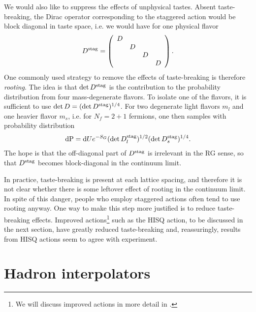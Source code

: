 We would also like to suppress the effects of unphysical tastes. Absent
taste-breaking, the Dirac operator corresponding to the staggered action
would be block diagonal in taste space, i.e. we would have for 
one physical flavor
\begin{equation}
D^{\rm stag}=\left(\begin{array}{cccc}
            D &   &  &  \\
              & D &  &  \\
              &   & D&  \\
              &   &  & D\\
            \end{array}\right).
\end{equation}
One commonly used strategy to remove the effects of taste-breaking is
therefore {\it rooting}\cite{marinari_monte_1981}. 
The idea is that $\det D^{\rm stag}$ is
the contribution to the probability distribution from four mass-degenerate
flavors. To isolate one of the flavors, it is sufficient to use
$\det D=(\det D^{\rm stag})^{1/4}$. For two degenerate light flavors
$m_l$ and one heavier flavor $m_s$, i.e. for $N_f=2+1$ fermions, 
one then samples with probability distribution
\begin{equation}\label{eq:HISQdist}
  \dd{\rm P}
    =\dd Ue^{-S_G}(\det D_l^{\rm stag})^{1/2}(\det D_s^{\rm stag})^{1/4}.
\end{equation}
The hope is that the off-diagonal part of $D^{\rm stag}$ is irrelevant
in the RG sense,
so that $D^{\rm stag}$ becomes block-diagonal in the continuum
limit.

In practice, taste-breaking is present at each lattice spacing, and
therefore it is not clear whether there is some leftover effect of rooting
in the continuum limit. In spite of this danger, people who employ staggered
actions often tend to use rooting anyway. One way to make this step more
justified is to reduce taste-breaking effects. Improved 
actions\footnote{We will discuss improved actions in more detail in 
.} such
as the HISQ action, to be discussed in the next section, have greatly
reduced taste-breaking and, reassuringly, results from HISQ actions
seem to agree with experiment.


\section{Hadron interpolators}\label{sec:interpolators}

